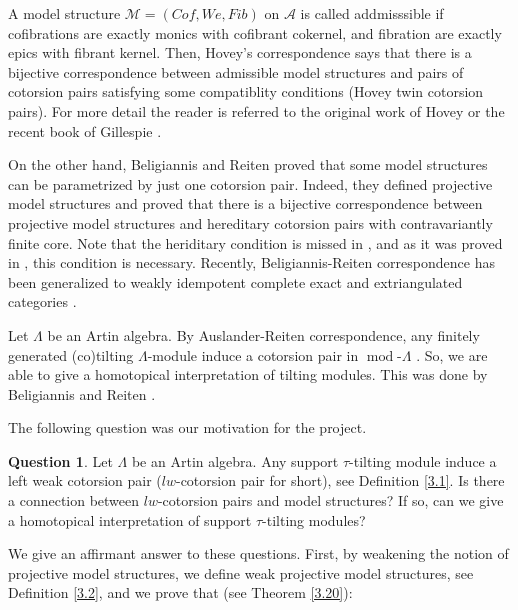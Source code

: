 \documentclass[12pt]{amsart}
\numberwithin{equation}{section}
\theoremstyle{definition}
\DeclareMathOperator{\modd}{mod}
\newtheorem{question}[lemma]{Question}
\newtheorem*{theorem 0*}{Theorem}
\newtheorem*{theorem a*}{Theorem A}
\newtheorem*{theorem b*}{Theorem B}
\numberwithin{diagram}{section}
\begin{document}
A model structure $\mathcal{M}=(Cof,We,Fib)$ on $\mathcal{A}$ is called addmisssible if cofibrations are exactly monics with cofibrant cokernel, and fibration are exactly epics with fibrant kernel. Then, Hovey's correspondence says that there is a bijective correspondence between admissible model structures and pairs of cotorsion pairs satisfying some compatiblity conditions (Hovey twin cotorsion pairs). For more detail the reader is referred to the original work of Hovey \cite{H2} or the recent book of Gillespie \cite{G}.

On the other hand, Beligiannis and Reiten proved that some model structures can be
parametrized by just one cotorsion pair. Indeed, they defined projective model structures and proved that there is a bijective correspondence between projective model structures and hereditary cotorsion pairs with contravariantly finite core. Note that the heriditary condition is missed in \cite{BR}, and as it was proved in \cite{CLZ}, this condition is necessary. Recently, Beligiannis-Reiten correspondence has been generalized to weakly idempotent complete exact and extriangulated categories \cite{CLZ,HZZZ}.

Let $\Lambda$ be an Artin algebra. By Auslander-Reiten correspondence, any finitely generated (co)tilting $\Lambda$-module induce a cotorsion pair in $\modd\text{-}\Lambda$ \cite{AR}. So, we are able to give a homotopical interpretation of tilting modules. This was done by Beligiannis and Reiten \cite{BR}.

The following question was our motivation for the project.

\begin{question}\label{1.1}
Let $\Lambda$ be an Artin algebra. Any support $\tau$-tilting module induce a left weak cotorsion pair ($lw$-cotorsion pair for short)\cite{BZ}, see Definition \ref{3.1}.
Is there a connection between $lw$-cotorsion pairs and model structures?
If so, can we give a homotopical interpretation of support $\tau$-tilting modules?
\end{question}
We give an affirmant answer to these questions.
First, by weakening the notion of projective model structures, we define weak projective model structures, see Definition \ref{3.2}, and we prove that (see Theorem \ref{3.20}):
\end{document}

